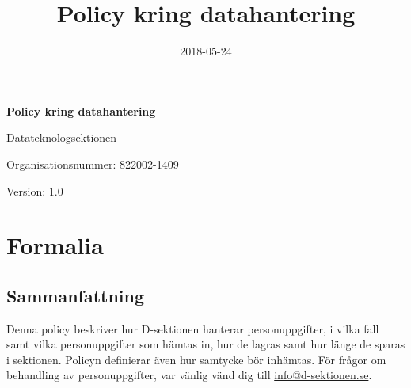 \documentclass{datateknologsektionen-document}
\title{Policy kring datahantering}
\date{2018-05-24}
\makeatletter
\newcommand*{\infomail}{\href{mailto://info@d-sektionen.se}{info@d-sektionen.se}}
\makeatother
\begin{document}
\hspace{0pt}
\vfill
\begin{center}
  \Huge\textbf{Policy kring datahantering}

  \huge Datateknologsektionen

  \large
  Organisationsnummer: 822002-1409

  Version: 1.0

\end{center}
\vfill
\hspace{0pt}
\pagebreak



\tableofcontents

\pagebreak

\section{Formalia}
\subsection{Sammanfattning}
Denna policy beskriver hur D-sektionen hanterar personuppgifter, i vilka fall samt vilka personuppgifter som hämtas in, hur de lagras samt hur länge de sparas i sektionen.
Policyn definierar även hur samtycke bör inhämtas.
För frågor om behandling av personuppgifter, var vänlig vänd dig till \infomail{}.
\end{document}
